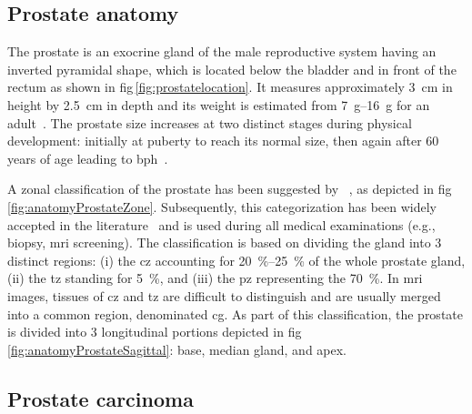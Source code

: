 \subsection{Prostate anatomy}\label{section:intro:anatomy}

The prostate is an exocrine gland of the male reproductive system having an
inverted pyramidal shape, which is located below the bladder and in front of
the rectum as shown in \acs{fig}\,\ref{fig:prostatelocation}.
It measures approximately \SI{3}{\cm} in height by \SI{2.5}{\cm} in depth and
its weight is estimated from \SIrange{7}{16}{\gram} for an
adult~\cite{Leissner1979}.
The prostate size increases at two distinct stages during physical development:
initially at puberty to reach its normal size, then again after 60 years of age
leading to \ac{bph}~\cite{Parfait2010}.

A zonal classification of the prostate has been suggested by
\citeauthor{McNeal1981}~\cite{McNeal1981}, as depicted in
\acs{fig}\,\ref{fig:anatomyProstateZone}.
Subsequently, this categorization has been widely accepted in the
literature~\cite{Hricak1987,Villers1991,Coakley2000,Parfait2010} and is used
during all medical examinations (e.g., biopsy, \ac{mri} screening).
The classification is based on dividing the gland into 3 distinct regions: (i)
the \ac{cz} accounting for \SIrange{20}{25}{\percent} of the whole prostate
gland, (ii) the \ac{tz} standing for \SI{5}{\percent}, and (iii) the \ac{pz}
representing the \SI{70}{\percent}.
In \ac{mri} images, tissues of \ac{cz} and \ac{tz} are difficult to distinguish
and are usually merged into a common region, denominated \ac{cg}.
As part of this classification, the prostate is divided into 3 longitudinal
portions depicted in \acs{fig}\,\ref{fig:anatomyProstateSagittal}: base, median
gland, and apex.

\subsection{Prostate carcinoma}

